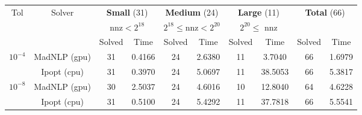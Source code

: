 \begin{tabular}{|c|c|cc|cc|cc|cc|}
  \hline
  \multirow{ 3}{*}{Tol} & \multirow{ 3}{*}{Solver} & \multicolumn{2}{c|}{\textbf{Small} (31)}& \multicolumn{2}{c|}{\textbf{Medium} (24)}& \multicolumn{2}{c|}{\textbf{Large} (11)}& \multicolumn{2}{c|}{\multirow{2}{*}{\textbf{Total} (66)}}\\
                        && \multicolumn{2}{c|}{nnz$<2^{18}$}& \multicolumn{2}{c|}{$2^{18}\leq$nnz$<2^{20}$}& \multicolumn{2}{c|}{$2^{20}\leq$ nnz}&&\\
                        &&  Solved & Time &  Solved & Time &  Solved & Time &  Solved & Time \\
  \hline
    \multirow{2}{*}{$10^{-4}$} & MadNLP (gpu) & 31 & 0.4166 & 24 & 2.6380 & 11 & 3.7040 & 66 & 1.6979  \\
                        & Ipopt (cpu) & 31 & 0.3970 & 24 & 5.0697 & 11 & 38.5053 & 66 & 5.3817  \\

  \hline
    \multirow{2}{*}{$10^{-8}$} & MadNLP (gpu) & 30 & 2.5037 & 24 & 4.6016 & 10 & 12.8040 & 64 & 4.6228  \\
                        & Ipopt (cpu) & 31 & 0.5100 & 24 & 5.4292 & 11 & 37.7818 & 66 & 5.5541  \\

  \hline
\end{tabular}
